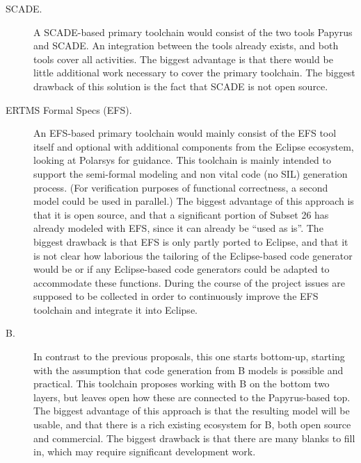 \begin{description}

\item[SCADE.] A SCADE-based primary toolchain would consist of the two tools Papyrus and SCADE.  An integration between the tools already exists, and both tools cover all activities.  The biggest advantage is that there would be little additional work necessary to cover the primary toolchain.  The biggest drawback of this solution is the fact that SCADE is not open source.

\item[ERTMS Formal Specs (EFS).] An EFS-based primary toolchain would mainly consist of the EFS tool itself and optional with additional components from the Eclipse ecosystem, looking at Polarsys for guidance. This toolchain is mainly intended to support the semi-formal modeling and non vital code (no SIL) generation process. (For verification purposes of functional correctness, a second model could be used in parallel.)
The biggest advantage of this approach is that it is open source, and that a significant portion of Subset 26 has already modeled with EFS, since it can already be ``used as is''. The biggest drawback is that EFS is only partly ported to Eclipse, and that it is not clear how laborious the tailoring of the Eclipse-based code generator would be or if any Eclipse-based code generators could be adapted to accommodate these functions. During the course of the project issues are supposed to be collected in order to continuously improve the EFS toolchain and integrate it into Eclipse.


\item[B.] In contrast to the previous proposals, this one starts bottom-up, starting with the assumption that code generation from B models is possible and practical.   This toolchain proposes working with B on the bottom two layers, but leaves open how these are connected to the Papyrus-based top.  The biggest advantage of this approach is that the resulting model will be usable, and that there is a rich existing ecosystem for B, both open source and commercial.  The biggest drawback is that there are many blanks to fill in, which may require significant development work.

\end{description}


